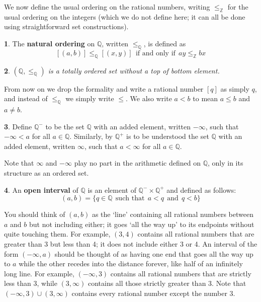 \documentclass[oneside,english]{amsbook}
\numberwithin{section}{chapter}
\theoremstyle{plain}
\newtheorem{thm}{\protect\theoremname}
\theoremstyle{definition}
\newtheorem{defn}[thm]{\protect\definitionname}
\providecommand{\definitionname}{Definition}
\providecommand{\theoremname}{Theorem}
\begin{document}
We now define the usual ordering on the rational numbers, writing $\le_\mathbb{Z}$ for the usual ordering on the integers (which we do not define here; it can all be done using straightforward set constructions).

\begin{defn}
	The \textbf{natural ordering} on $\mathbb{Q}$,  written $\le_\mathbb{Q}$, is defined as
		\[
			[(a,b)]\le_\mathbb{Q}[(x,y)]\ \ \text{if and only if}\ \ ay\le_\mathbb{Z} bx
		\]
\end{defn}

\begin{thm}
	$(\mathbb{Q}, \le_\mathbb{Q})$ is a totally ordered set without a top of bottom element.
\end{thm}

From now on we drop the formality and write a rational number $[q]$ as simply $q$, and instead of $\le_\mathbb{Q}$ we simply write $\le$. We also write $a<b$ to mean $a\le b$ and $a\ne b$. 

\begin{defn}
	Define $\mathbb{Q}^-$ to be the set $\mathbb{Q}$ with an added element, written $-\infty$, such that $-\infty < a$ for all $a\in \mathbb{Q}$. Similarly, by $\mathbb{Q}^+$ is to be understood the set $\mathbb{Q}$ with an added element, written $\infty$, such that $a < \infty$ for all $a\in \mathbb{Q}$.
\end{defn}

Note that $\infty$ and $-\infty$ play no part in the arithmetic defined on $\mathbb{Q}$, only in its structure as an ordered set.

\begin{defn}
	An \textbf{open interval} of $\mathbb{Q}$ is an element of $\mathbb{Q}^-\times\mathbb{Q}^+$ and defined as follows:
	\[
		(a, b) = \{q\in \mathbb{Q} \ \ \text{such that}\ \ a < q\ \ \text{and}\ \ q < b\}
	\]
\end{defn}

You should think of $(a, b)$ as the `line' containing all rational numbers between $a$ and $b$ but not including either; it goes `all the way up' to its endpoints without quite touching them. For example, $(3, 4)$ contains all rational numbers that are greater than 3 but less than 4; it does not include either 3 or 4. An interval of the form $(-\infty, a)$ should be thought of as having one end that goes all the way up to $a$ while the other recedes into the distance forever, like half of an infinitely long line. For example, $(-\infty, 3)$ contains all rational numbers that are strictly less than 3, while $(3, \infty)$ contains all those strictly greater than 3. Note that $(-\infty, 3)\cup(3, \infty)$ contains every rational number except the number 3.
\end{document}
